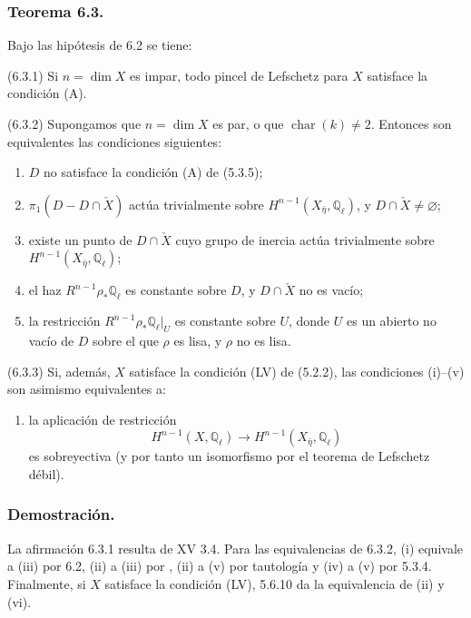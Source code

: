 \subsubsection*{Teorema 6.3.}

Bajo las hipótesis de 6.2 se tiene:

\medskip
\noindent
\textup{(6.3.1)} Si $n=\dim X$ es impar, todo pincel de Lefschetz para
$X$ satisface la condición (A).

\medskip
\noindent
\textup{(6.3.2)} Supongamos que $n=\dim X$ es par, o que
$\operatorname{char}(k)\ne2$. Entonces son equivalentes las condiciones
siguientes:
\begin{enumerate}
\item[(i)] $D$ no satisface la condición (A) de (5.3.5);
\item[(ii)] $\pi_1(D-D\cap\check X)$ actúa trivialmente sobre
  $H^{n-1}(X_{\bar\eta},\mathbb Q_\ell)$, y
  $D\cap\check X\ne\varnothing$;
\item[(iii)] existe un punto de $D\cap\check X$ cuyo grupo de inercia
  actúa trivialmente sobre $H^{n-1}(X_{\bar\eta},\mathbb Q_\ell)$;
\item[(iv)] el haz $R^{n-1}\rho_*\mathbb Q_\ell$ es constante sobre
  $D$, y $D\cap\check X$ no es vacío;
\item[(v)] la restricción
  $R^{n-1}\rho_*\mathbb Q_\ell\vert_U$ es constante sobre $U$, donde
  $U$ es un abierto no vacío de $D$ sobre el que $\rho$ es lisa, y
  $\rho$ no es lisa.
\end{enumerate}

\noindent
\textup{(6.3.3)} Si, además, $X$ satisface la condición (LV) de
(5.2.2), las condiciones (i)--(v) son asimismo equivalentes a:
\begin{enumerate}
\item[(vi)] la aplicación de restricción
\[
H^{n-1}(X,\mathbb Q_\ell)
\longrightarrow H^{n-1}(X_{\bar\eta},\mathbb Q_\ell)
\]
es sobreyectiva (y por tanto un isomorfismo por el teorema de Lefschetz
débil).
\end{enumerate}

\subsubsection*{Demostración.}

La afirmación 6.3.1 resulta de XV 3.4. Para las equivalencias de 6.3.2,
(i) equivale a (iii) por 6.2, (ii) a (iii) por , (ii) a (v) por
tautología y (iv) a (v) por 5.3.4. Finalmente, si $X$ satisface la
condición (LV), 5.6.10 da la equivalencia de (ii) y (vi).

